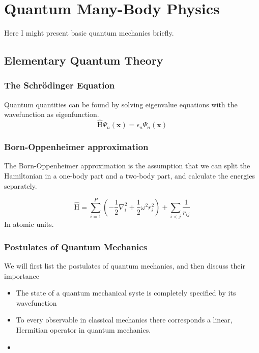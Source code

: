 \section{Quantum Many-Body Physics} \label{sec:quantum}
Here I might present basic quantum mechanics briefly.

\subsection{Elementary Quantum Theory} \label{subsec:elementary}
\subsubsection{The Schrödinger Equation} \label{subsubsec:schrodinger}
Quantum quantities can be found by solving eigenvalue equations with the wavefunction as eigenfunction. 
\begin{equation}
\label{eq:Energy}
\hat{\text{H}}\Psi_n(\boldsymbol{x})=\epsilon_n\Psi_n(\boldsymbol{x})
\end{equation}


\subsubsection{Born-Oppenheimer approximation} \label{subsubsec:bornoppenheimer}
The Born-Oppenheimer approximation is the assumption that we can split the Hamiltonian in a one-body part and a two-body part, and calculate the energies separately. 

\begin{equation}
\label{eq:Hamiltonian}
\hat{\text{H}} = \sum_{i=1}^{P} (-\frac{1}{2} \nabla_i^2 + \frac{1}{2} \omega^2 r_i ^2) + \sum_{i<j} \frac{1}{r_{ij}} 
\end{equation}
In atomic units. 

\subsubsection{Postulates of Quantum Mechanics} \label{subsubsec:postulates}
We will first list the postulates of quantum mechanics, and then discuss their importance
\begin{itemize}
	\item The state of a quantum mechanical syste is completely specified by its wavefunction
	\item To every observable in classical mechanics there corresponds a linear, Hermitian operator in quantum mechanics. 
	\item 
\end{itemize}

